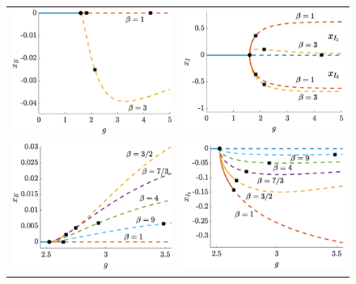 \documentclass[reqno]{siamonline190516}
\begin{document}
\begin{figure}
    \centering
    \begin{tabular}{cc}
    \includegraphics[width=7.8cm]{bdnoclusters20E.eps} &
    \includegraphics[width=7.8cm]{bdnoclusters20I.eps} \\
    \includegraphics[width=7.8cm]{bdnoclusters50E.eps} &
    \includegraphics[width=7.8cm]{bdnoclusters50I.eps}

\end{tabular}
\end{figure}
\end{document}
